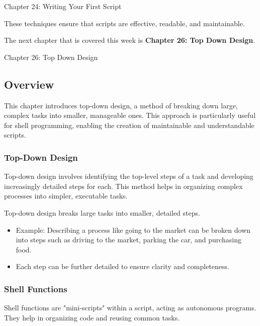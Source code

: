 \begin{notes}{Chapter 24: Writing Your First Script}
\begin{highlight}
    These techniques ensure that scripts are effective, readable, and maintainable.
    
    \end{highlight}
\end{notes}

The next chapter that is covered this week is \textbf{Chapter 26: Top Down Design}.

\begin{notes}{Chapter 26: Top Down Design}
    \subsection*{Overview}

    This chapter introduces top-down design, a method of breaking down large, complex tasks into smaller, manageable ones. This approach is particularly useful for shell programming, enabling the 
    creation of maintainable and understandable scripts.
    
    \subsubsection*{Top-Down Design}
    
    Top-down design involves identifying the top-level steps of a task and developing increasingly detailed steps for each. This method helps in organizing complex processes into simpler, executable tasks.
    
    \begin{highlight}
    
    Top-down design breaks large tasks into smaller, detailed steps.
    
    \begin{itemize}
        \item Example: Describing a process like going to the market can be broken down into steps such as driving to the market, parking the car, and purchasing food.
        \item Each step can be further detailed to ensure clarity and completeness.
    \end{itemize}
    
    \end{highlight}
    
    \subsubsection*{Shell Functions}
    
    Shell functions are "mini-scripts" within a script, acting as autonomous programs. They help in organizing code and reusing common tasks.
    

\end{notes}
